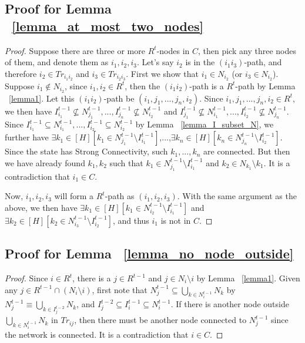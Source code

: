 \documentclass[12pt]{article}
\theoremstyle{remark}
\theoremstyle{remark}
\begin{document}
\subsection{Proof for Lemma ~\ref{lemma_at_most_two_nodes}}
\begin{proof}
Suppose there are three or more $R^t$-nodes in $C$, then pick any three nodes of them, and denote them as $i_1,i_2,i_3$. Let's say $i_2$ is in the $(i_1i_3)$-path, and therefore $i_2\in Tr_{i_1i_2}$ and $i_3\in Tr_{i_2i_3}$. First we show that $i_1\in N_{i_2}$ (or $i_3\in N_{i_2}$). Suppose $i_1\notin N_{i_2}$, since $i_1,i_2\in R^t$, then the $(i_1i_2)$-path is a $R^t$-path by Lemma ~\ref{lemma1}. Let this $(i_1i_2)$-path be $(i_1,j_1,...,j_n,i_2)$. Since $i_1,j_1,...,j_n,i_2\in R^t$, we then have $I^{t-1}_{i_1}\nsubseteq N^{t-1}_{j_1},...,I^{t-1}_{j_n}\nsubseteq N^{t-1}_{i_2}$ and $I^{t-1}_{j_1}\nsubseteq N^{t-1}_{i_1},...,I^{t-1}_{i_2}\nsubseteq N^{t-1}_{j_n}$. Since $I^{t-1}_{i_1}\subseteq N^{t-1}_{i_1},...,I^{t-1}_{i_2}\subseteq N^{t-1}_{i_2}$ by Lemma ~\ref{lemma_I_subset_N}, we further have $\exists k_1\in [H][k_1\in N^{t-1}_{j_1}\setminus I^{t-1}_{i_1}]$,...,$\exists k_n\in [H][k_n\in N^{t-1}_{j_n}\setminus I^{t-1}_{i_2}]$. Since the state has Strong Connectivity, such $k_1,...,k_n$ are connected. But then we have already found $k_1,k_2$ such that $k_1\in N^{t-1}_{j_1}\setminus I^{t-1}_{i_1}$ and $k_2\in N_{k_1}\setminus k_1$. It is a contradiction that $i_1\in C$.

Now, $i_1,i_2,i_3$ will form a $R^t$-path as $(i_1,i_2,i_3)$. With the same argument as the above, we then have $\exists k_1\in [H][k_1\in N^{t-1}_{i_2}\setminus I^{t-1}_{i_1}]$ and $\exists k_2\in [H][k_2\in N^{t-1}_{i_3}\setminus I^{t-1}_{i_2}]$, and thus $i_1$ is not in $C$.
\end{proof}

\subsection{Proof for Lemma ~\ref{lemma_no_node_outside}}
\begin{proof}
Since $i\in R^t$, there is a $j\in R^{t-1}$ and $j\in N_i\setminus i$ by Lemma ~\ref{lemma1}. Given any $j\in R^{t-1}\cap (N_i\setminus i)$, first note that $N^{t-1}_j\subseteq \bigcup_{k\in N^{t-1}_i}N_k$ by $N^{t-1}_j \equiv \bigcup_{k\in I^{t-2}_j}N_k$, and $I^{t-2}_j\subseteq I^{t-1}_i\subseteq N^{t-1}_i$. If there is another node outside $\bigcup_{k\in N^{t-1}_i}N_k$ in $Tr_{ij}$, then there must be another node connected to $N^{t-1}_j$ since the network is connected. It is a contradiction that $i\in C$.

\end{proof}
\end{document}
